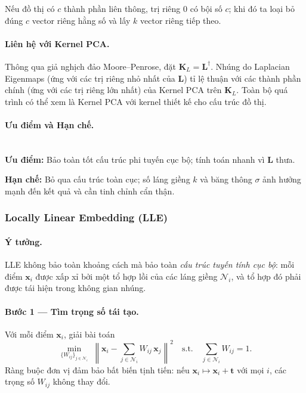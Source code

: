 \begin{remark}
Nếu đồ thị có $c$ thành phần liên thông, trị riêng $0$ có bội số $c$; khi
đó ta loại bỏ đúng $c$ vector riêng hằng số và lấy $k$ vector riêng tiếp
theo.
\end{remark}
 
\paragraph{Liên hệ với Kernel PCA.}
Thông qua giả nghịch đảo Moore–Penrose, đặt $\mathbf{K}_L = \mathbf{L}^\dagger$.
Nhúng do Laplacian Eigenmaps (ứng với các trị riêng nhỏ nhất của $\mathbf{L}$)
tỉ lệ thuận với các thành phần chính (ứng với các trị riêng lớn nhất) của
Kernel PCA trên $\mathbf{K}_L$. Toàn bộ quá trình có thể xem là Kernel PCA
với kernel thiết kế cho cấu trúc đồ thị.
 
\paragraph{Ưu điểm và Hạn chế.}\mbox{}\\[2pt]
\textbf{Ưu điểm:}
Bảo toàn tốt cấu trúc phi tuyến cục bộ; tính toán nhanh vì $\mathbf{L}$ thưa.
 
\textbf{Hạn chế:}
Bỏ qua cấu trúc toàn cục; số láng giềng $k$ và băng thông $\sigma$ ảnh
hưởng mạnh đến kết quả và cần tinh chỉnh cẩn thận.
 
\subsubsection{Locally Linear Embedding (LLE)}
 
\paragraph{Ý tưởng.}
LLE không bảo toàn khoảng cách mà bảo toàn \emph{cấu trúc tuyến tính cục
bộ}: mỗi điểm $\mathbf{x}_i$ được xấp xỉ bởi một tổ hợp lồi của các láng
giềng $\mathcal{N}_i$, và tổ hợp đó phải được tái hiện trong không gian nhúng.
 
\paragraph{Bước 1 — Tìm trọng số tái tạo.}
Với mỗi điểm $\mathbf{x}_i$, giải bài toán
\begin{equation}\label{eq:lle_w}
  \min_{\{W_{ij}\}_{j\in\mathcal{N}_i}}\;
  \left\|\mathbf{x}_i - \sum_{j \in \mathcal{N}_i} W_{ij}\,\mathbf{x}_j\right\|^2
  \quad \text{s.t.} \quad
  \sum_{j \in \mathcal{N}_i} W_{ij} = 1.
\end{equation}
Ràng buộc đơn vị đảm bảo bất biến tịnh tiến: nếu $\mathbf{x}_i \mapsto
\mathbf{x}_i + \mathbf{t}$ với mọi $i$, các trọng số $W_{ij}$ không thay đổi.
 
